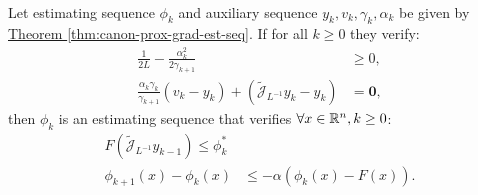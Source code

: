 \documentclass[12pt]{article}
\begin{document}
    \begin{theorem}\;\\
        Let estimating sequence $\phi_k$ and auxiliary sequence $y_k, v_k,\gamma_k, \alpha_k$  be given by 
        \hyperref[thm:canon-prox-grad-est-seq]{Theorem \ref*{thm:canon-prox-grad-est-seq}}. 
        If for all $k\ge 0$ they verify: 
        \begin{align*}
            \frac{1}{2L} - \frac{\alpha_k^2}{2 \gamma_{k + 1}} &\ge 0, 
            \\
            \frac{\alpha_k \gamma_k }{\gamma_{k + 1}} 
            (v_k - y_k) + (\widetilde {\mathcal J}_{L^{-1}} y_k - y_k) &= \mathbf 0, 
        \end{align*}
        then $\phi_{k}$ is an estimating sequence that verifies $\forall x \in \mathbb R^n, k \ge 0$: 
        \begin{align*}
            F\left(
                \widetilde{\mathcal J}_{L^{-1}} y_{k - 1}
            \right)\le \phi_k^*
            \\
            \phi_{k + 1}(x) - \phi_k(x) &\le -\alpha(\phi_k(x) - F(x)). 
        \end{align*}
    \end{theorem}
\end{document}
